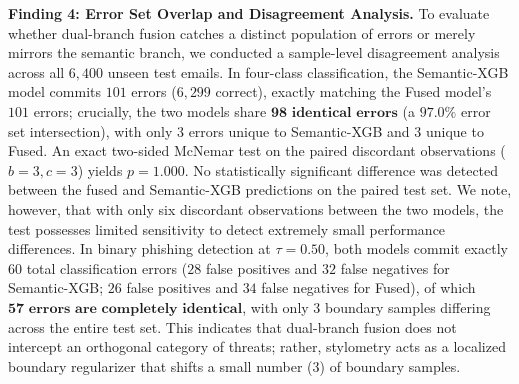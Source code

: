 \documentclass[journal]{IEEEtran}
\begin{document}
\textbf{Finding 4: Error Set Overlap and Disagreement Analysis.} To evaluate whether dual-branch fusion catches a distinct population of errors or merely mirrors the semantic branch, we conducted a sample-level disagreement analysis across all $6,400$ unseen test emails. In four-class classification, the Semantic-XGB model commits $101$ errors ($6{,}299$ correct), exactly matching the Fused model's $101$ errors; crucially, the two models share $\mathbf{98\text{ identical errors}}$ (a $97.0\%$ error set intersection), with only $3$ errors unique to Semantic-XGB and $3$ unique to Fused. An exact two-sided McNemar test on the paired discordant observations ($b = 3, c = 3$) yields $p = 1.000$. No statistically significant difference was detected between the fused and Semantic-XGB predictions on the paired test set. We note, however, that with only six discordant observations between the two models, the test possesses limited sensitivity to detect extremely small performance differences. In binary phishing detection at $\tau = 0.50$, both models commit exactly $60$ total classification errors ($28$ false positives and $32$ false negatives for Semantic-XGB; $26$ false positives and $34$ false negatives for Fused), of which $\mathbf{57\text{ errors are completely identical}}$, with only $3$ boundary samples differing across the entire test set. This indicates that dual-branch fusion does not intercept an orthogonal category of threats; rather, stylometry acts as a localized boundary regularizer that shifts a small number ($3$) of boundary samples.
\end{document}
